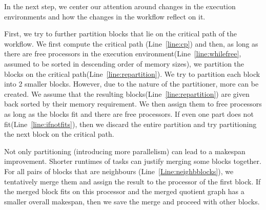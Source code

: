 \documentclass[11pt]{article}
\begin{document}
    In the next step, we center our attention around changes in the execution environments and how the changes in
    the workflow reflect on it.

    First, we try to further partition blocks that lie on the critical path of the workflow.
    We first compute the critical path (Line~\ref{line:cp}) and then, as long as there are free processors in the
    execution environment(Line~\ref{line:whilefree}, assumed to be sorted in descending order of memory sizes),
    we partition the blocks on the critical path(Line~\ref{line:repartition}).
    We try to partition each block into 2 smaller blocks.
    However, due to the nature of the partitioner, more can be created.
    We assume that the resulting blocks(Line~\ref{line:repartition}) are given back sorted by their memory requirement.
    We then assign them to free processors as long as the blocks fit and there are free processors.
    If even one part does not fit(Line~\ref{line:ifnotfits}), then we discard the entire partition and try partitioning
    the next block on the critical path.

    Not only partitioning (introducing more parallelism) can lead to a makespan improvement.
    Shorter runtimes of tasks can justify merging some blocks together.
    For all pairs of blocks that are neighbours (Line~\ref{Line:neighbblocks}), we tentatively merge them and assign
    the result to the processor of the first block.
    If the merged block fits on this processor and the merged quotient graph has a smaller overall makespan, then we save
    the merge and proceed with other blocks.
\end{document}
